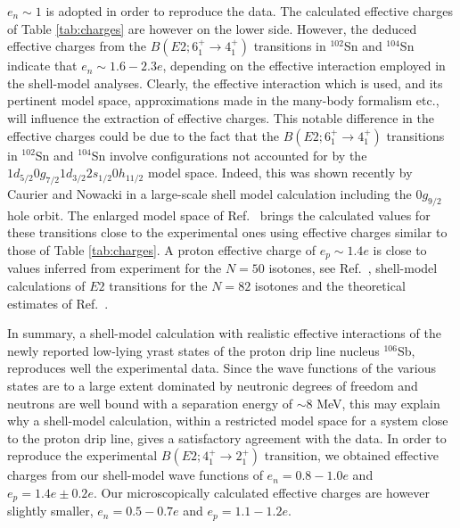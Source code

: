 $e_n\sim 1$ is adopted in order to reproduce the data.  
The calculated effective charges of 
Table \ref{tab:charges} are however on the lower side.
However, the deduced effective charges from the 
$B(E2;6_1^+\rightarrow 4_1^+)$ transitions in $^{102}$Sn \cite{matej} and $^{104}$Sn
\cite{hubert95} indicate that $e_n\sim 1.6-2.3e$, depending
on the effective interaction employed in the shell-model analyses. Clearly, the effective
interaction which is used, and its pertinent model space, approximations
made in the many-body formalism etc., will influence the extraction of effective charges.
This notable difference in the effective charges could be due to the fact that
the  $B(E2;6_1^+\rightarrow 4_1^+)$ transitions in $^{102}$Sn and $^{104}$Sn
involve configurations not accounted for by the 
$1d_{5/2}0g_{7/2}1d_{3/2}2s_{1/2}0h_{11/2}$ model space.
Indeed, this was shown recently by Caurier and Nowacki \cite{frederic99}
in a large-scale shell model calculation including the $0g_{9/2}$ hole
orbit. The enlarged model space of Ref.\ \cite{frederic99} 
brings the calculated  values 
for these transitions close to the experimental ones using
effective charges similar to those of Table \ref{tab:charges}.
A proton effective charge of $e_p\sim 1.4e$ is close to values inferred
from experiment for the $N=50$ isotones, see Ref.\ \cite{sn100a,sn100b}, 
shell-model
calculations of $E2$ transitions for the $N=82$ isotones \cite{hehos97} and
the theoretical estimates of Ref.\ \cite{ssbw87}.

In summary, a shell-model calculation with realistic effective
interactions of the newly reported low-lying
yrast states of  the proton drip line nucleus $^{106}$Sb, reproduces well
the experimental data. Since the wave functions of the various states are to a large
extent dominated by neutronic degrees of freedom and neutrons are well
bound with a separation energy of $\sim 8$ MeV, this may explain why a shell-model
calculation, within a restricted model space for a system close to the proton drip line,
gives a satisfactory agreement with the data.  
In order to reproduce the experimental 
$B(E2;4_1^+\rightarrow 2_1^+)$ transition, we obtained 
effective charges from our shell-model wave functions of 
$e_n=0.8-1.0e$ and $e_p=1.4e\pm 0.2e$. 
Our microscopically calculated effective charges are however slightly smaller,
$e_n=0.5-0.7e$ and $e_p=1.1-1.2e$.

